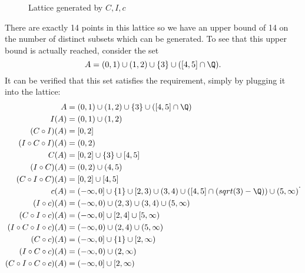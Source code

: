 \documentclass[11pt,letterpaper]{article}
\begin{document}
\begin{changemargin}{1em}{1em}
\begin{figure}[ht]
          \caption{Lattice generated by $C, I, c$} 
    \end{figure}   

    There are exactly 14 points in this lattice so we have an upper bound of 14 on the number of distinct subsets which can be generated. To see that this upper bound is actually reached, consider the set
    \[
      A = (0,1)\cup(1,2)\cup\{3\}\cup([4,5]\cap \Q)
    .\] 
    It can be verified that this set satisfies the requirement, simply by plugging it into the lattice:
    \[
        \begin{aligned}
            A &= (0,1)\cup (1,2) \cup \{3\} \cup ([4,5]\cap \Q)\\
            I(A) &= (0,1)\cup (1,2)\\
            (C\circ I)(A) &= [0,2]\\
            (I\circ C\circ I)(A)&= (0,2)\\
            C(A) &= [0,2]\cup \{3\} \cup [4,5]\\
            (I\circ C)(A) &= (0,2)\cup (4,5)\\
            (C\circ I \circ C)(A) &= [0,2] \cup [4,5]\\
            c(A)&=(-\infty, 0]\cup\{1\}\cup [2,3)\cup (3,4)\cup ([4,5]\cap (\R-\Q))\cup (5,\infty)\\
            (I\circ c)(A)&= (-\infty,0)\cup(2,3)\cup(3,4)\cup (5,\infty)\\
            (C\circ I \circ c)(A)&=(-\infty,0]\cup[2,4]\cup [5,\infty)\\
            (I\circ C\circ I \circ c)(A)&=(-\infty, 0)\cup (2,4)\cup (5,\infty)\\
            (C\circ c)(A)&=(-\infty,0]\cup\{1\}\cup[2,\infty)\\
            (I\circ C\circ c)(A)&=(-\infty, 0)\cup (2,\infty)\\
            (C\circ I \circ C\circ c)(A)&=(-\infty, 0]\cup [2,\infty)
        \end{aligned}
    .\] 
\end{changemargin}
\end{document}
